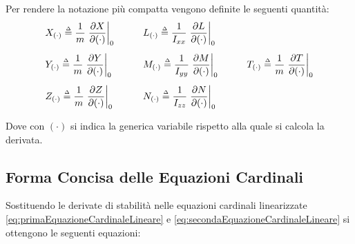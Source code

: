 Per rendere la notazione più compatta vengono definite le seguenti quantità:
\begin{equation*}
    \setlength{\arraycolsep}{1.5em}
    \begin{array}{lll}
        X_{(\cdot)} \defequal \displaystyle\frac{1}{m}\left.\displaystyle\frac{\partial X}{\partial (\cdot)}\right|_0 & L_{(\cdot)} \defequal \displaystyle\frac{1}{I_{xx}}\left.\displaystyle\frac{\partial L}{\partial (\cdot)}\right|_0 &                                                                                                               \\[1.5em]
        Y_{(\cdot)} \defequal \displaystyle\frac{1}{m}\left.\displaystyle\frac{\partial Y}{\partial (\cdot)}\right|_0 & M_{(\cdot)} \defequal \displaystyle\frac{1}{I_{yy}}\left.\displaystyle\frac{\partial M}{\partial (\cdot)}\right|_0 & T_{(\cdot)} \defequal \displaystyle\frac{1}{m}\left.\displaystyle\frac{\partial T}{\partial (\cdot)}\right|_0 \\[1.5em]
        Z_{(\cdot)} \defequal \displaystyle\frac{1}{m}\left.\displaystyle\frac{\partial Z}{\partial (\cdot)}\right|_0 & N_{(\cdot)} \defequal \displaystyle\frac{1}{I_{zz}}\left.\displaystyle\frac{\partial N}{\partial (\cdot)}\right|_0 &                                                                                                               \\
    \end{array}
\end{equation*}

Dove con $(\cdot)$ si indica la generica variabile rispetto alla quale si calcola la derivata.

\subsection{Forma Concisa delle Equazioni Cardinali}
Sostituendo le derivate di stabilità nelle equazioni cardinali linearizzate \eqref{eq:primaEquazioneCardinaleLineare} e \eqref{eq:secondaEquazioneCardinaleLineare} si ottengono le seguenti equazioni:

